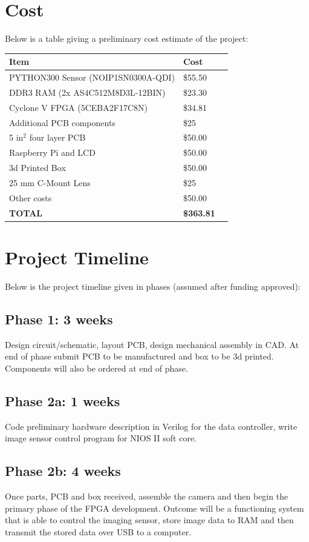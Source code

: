 \documentclass[12pt]{article}
\begin{document}
\section{Cost}
Below is a table giving a preliminary cost estimate of the project:
\begin{table}[h]
 \renewcommand\tabcolsep{12pt}
\renewcommand{\arraystretch}{1.25}
\centering
\begin{tabular}{lll}
\hline\hline
\textbf{Item} & \textbf{Cost}\\ 
\hline 
PYTHON300 Sensor (NOIP1SN0300A-QDI)& \$55.50\\ 
\hline 
DDR3 RAM (2x AS4C512M8D3L-12BIN) & \$23.30 \\ 
\hline 
Cyclone V FPGA (5CEBA2F17C8N) & \$34.81 \\ 
\hline 
Additional PCB components & \$25 \\ 
\hline 
5 in$^2$ four layer PCB & \$50.00 \\ 
\hline 
Raspberry Pi and LCD & \$50.00 \\ 
\hline 
3d Printed Box & \$50.00\\
\hline
25 mm C-Mount Lens& \$25 \\ 
\hline 
Other costs & \$50.00 \\ 
\hline\hline 
\textbf{TOTAL}& \textbf{\$363.81} \\ 
\hline 
\end{tabular}
\end{table}
\section{Project Timeline}
Below is the project timeline given in phases (assumed after funding approved):\\\par 
\subsection*{\normalsize Phase 1: 3 weeks}
Design circuit/schematic, layout PCB, design mechanical assembly in CAD. At end of phase submit PCB to be manufactured and box to be 3d printed. Components will also be ordered at end of phase.
\subsection*{\normalsize Phase 2a: 1 weeks}
Code preliminary hardware description in Verilog for the data controller, write image sensor control program for NIOS II soft core.
\subsection*{\normalsize Phase 2b: 4 weeks}
Once parts, PCB and box received, assemble the camera and then begin the primary phase of the FPGA development. Outcome will be a functioning system that is able to control the imaging sensor, store image data to RAM and then transmit the stored data over USB to a computer.
\end{document}
